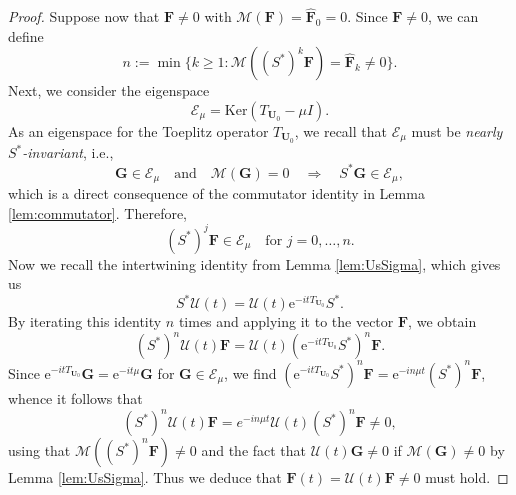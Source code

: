 \documentclass[10pt,reqno,a4paper]{amsart}
\theoremstyle{definition}
\theoremstyle{remark}
\theoremstyle{remark}
\numberwithin{equation}{section}
\newcommand{\Mean}{\mathscr{M}}
\renewcommand{\ker}{\mathrm{Ker}}
\newcommand{\be}{\begin{equation}}
\newcommand{\ee}{\end{equation}}
\newcommand{\eu}{\mathrm{e}}
\newcommand{\Ub}{\mathbf{U}}
\newcommand{\Fb}{\mathbf{F}}
\newcommand{\Gb}{\mathbf{G}}
\newcommand{\id}{I}
\newcommand{\Es}{\mathscr{E}}
\newcommand{\Us}{\mathscr{U}}
\begin{document}
\begin{proof}
Suppose now that $\Fb \neq 0$ with $\Mean(\Fb)=\widehat{\Fb}_0=0$. Since $\Fb \neq 0$, we can define 
$$
n := \min \{ k \geq 1 : \Mean((S^*)^k \Fb) = \widehat{\Fb}_k \neq 0 \}.
$$
Next, we consider the eigenspace
$$
\Es_{\mu} = \ker ( T_{\Ub_0} - \mu \id).
$$
As an eigenspace for the Toeplitz operator $T_{\Ub_0}$, we recall that $\Es_\mu$ must be {\em nearly $S^*$-invariant}, i.e., 
$$
\Gb \in \Es_\mu \quad \mbox{and} \quad \Mean(\Gb) = 0 \quad \Rightarrow \quad S^* \Gb \in \Es_\mu,
$$
which is a direct consequence of the commutator identity in Lemma \ref{lem:commutator}. Therefore, 
$$
(S^*)^j \Fb \in \Es_{\mu} \quad \mbox{for $j=0, \ldots, n$}.
$$ 
Now we recall the intertwining identity from Lemma \ref{lem:UsSigma}, which gives us
\be \label{eq:intertwine}
S^* \Us(t) = \Us(t) \eu^{-it T_{\Ub_0}} S^*.
\ee
By iterating this identity $n$ times and applying it to the vector $\Fb$, we obtain
$$
(S^*)^n \Us(t) \Fb = \Us(t) (\eu^{-it T_{\Ub_0}} S^*)^n \Fb.
$$
Since $\eu^{-it T_{\Ub_0}} \Gb = \eu^{-it \mu} \Gb$ for $\Gb \in \Es_\mu$, we find $(\eu^{-it T_{\Ub_0}} S^*)^n \Fb= \eu^{-in \mu t} (S^*)^n \Fb$, whence it follows that
$$
(S^*)^n \Us(t) \Fb= e^{-in \mu t} \Us(t) (S^*)^n \Fb \neq 0,
$$
using that $\Mean((S^*)^n \Fb) \neq 0$ and the fact that $\Us(t) \Gb \neq 0$ if $\Mean(\Gb) \neq 0$ by Lemma \ref{lem:UsSigma}. Thus we deduce that $\Fb(t) = \Us(t) \Fb \neq 0$ must hold.
\end{proof}
\end{document}
